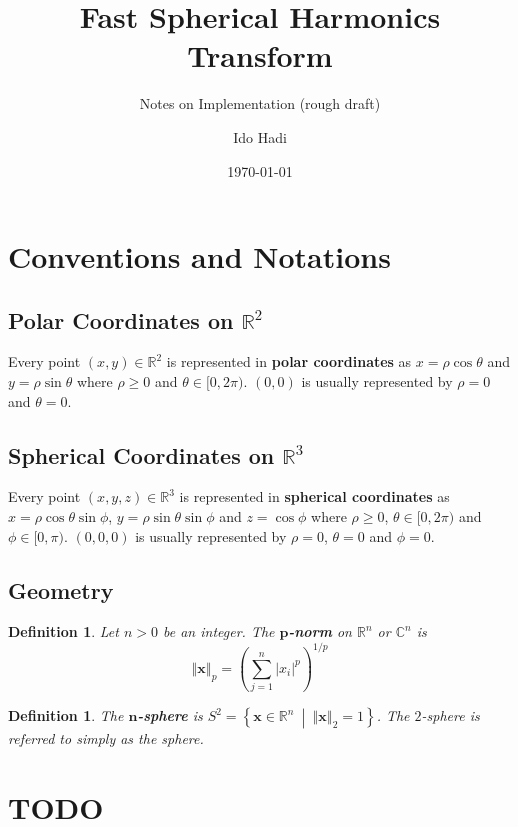 \documentclass[a4paper,11pt]{scrartcl}
\title{Fast Spherical Harmonics Transform}
\subtitle{Notes on Implementation (rough draft)}
\date{\today}
\author{Ido Hadi}
\newcommand{\F}[1][R]{\mathbb{#1}}
\newcommand{\Ltwonorm}[1]{\left\Vert #1 \right\Vert}
\newcommand{\setsep}{\ \middle|\ }
\newcounter{cnt}
\newtheorem{definition1}[cnt]{Definition}
\begin{document}
	\maketitle
	
	\tableofcontents
	
	\section{Conventions and Notations}
	
	\subsection{Polar Coordinates on $ \F^{2} $}
	Every point $ (x,y) \in \F^{2} $ is represented in \textbf{polar coordinates} as $ x = \rho \cos \theta $ and $ y = \rho \sin \theta $ where $ \rho \ge 0 $ and $ \theta \in [0, 2 \pi) $. $ (0,0) $ is usually represented by $ \rho = 0 $ and $ \theta = 0 $.
	
	\subsection{Spherical Coordinates on $ \F^{3} $}
	Every point $ (x,y,z) \in \F^{3} $ is represented in \textbf{spherical coordinates} as $ x = \rho \cos \theta \sin \phi $, $ y = \rho \sin \theta \sin \phi $ and $ z = \cos \phi  $ where $ \rho \ge 0 $, $ \theta \in [0, 2 \pi) $ and $ \phi \in [0, \pi ) $. $ (0,0,0) $ is usually represented by $ \rho = 0 $, $ \theta = 0 $ and $ \phi = 0 $.
	
	\subsection{Geometry}
	
	\begin{definition1}
		Let $ n > 0 $ be an integer. The \textbf{$ \bm{p} $-norm} on $ \F^{n} $ or $ \F[C]^{n} $ is
		\begin{equation*}
		\Ltwonorm{\mathbf{x}}_{p}
		= \left( \sum_{j=1}^{n} \left|x_i\right|^{p} \right)^{1/p}
		\end{equation*}
	\end{definition1}
	
	\begin{definition1}
		The \textbf{$ \bm{n} $-sphere} is $ S^2 = \left\{ \mathbf{x} \in \F^{n} \setsep \Ltwonorm{\mathbf{x}}_2 = 1 \right\} $. The $ 2 $-sphere is referred to simply as the sphere.
	\end{definition1}
	
	\section{TODO}
	
	\printbibliography
	
\end{document}
